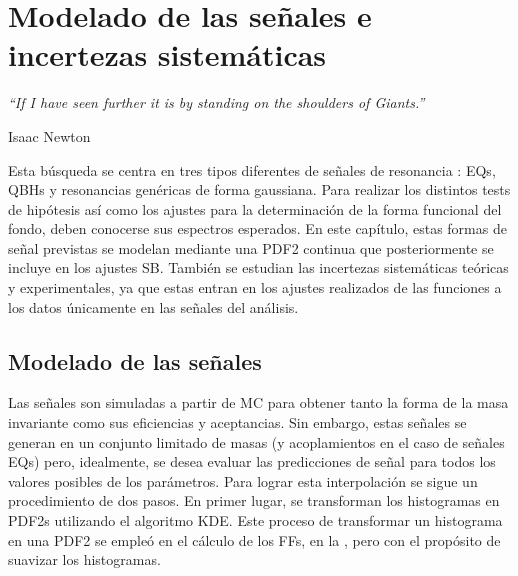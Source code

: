 \chapter{Modelado de las señales e incertezas sistemáticas}
\label{ch:signals}
\epigraph{\emph{``If I have seen further it is by standing on the shoulders of Giants.”}}{Isaac Newton}


Esta búsqueda se centra en tres tipos diferentes de señales de resonancia \gammajet: \acp{EQ}, \acp{QBH} y resonancias genéricas de forma gaussiana. Para realizar los distintos tests de hipótesis así como los ajustes para la determinación de la forma funcional del fondo, deben conocerse sus espectros \myj esperados.
En este capítulo, estas formas de señal previstas se modelan mediante una \ac{PDF2} continua que posteriormente se incluye en los ajustes \ac{SB}.
También se estudian las incertezas sistemáticas teóricas y experimentales, ya que estas entran en los ajustes realizados de las funciones a los datos únicamente en las señales del análisis.













\section{Modelado de las señales}
\label{sec:signals:modeling}

Las señales son simuladas a partir de \ac{MC} para obtener tanto la forma de la masa invariante como sus eficiencias y aceptancias. Sin embargo, estas señales se generan en un conjunto limitado de masas (y acoplamientos en el caso de señales \acp{EQ}) pero, idealmente, se desea evaluar las predicciones de señal para todos los valores posibles de los parámetros.
Para lograr esta interpolación se sigue un procedimiento de dos pasos. En primer lugar, se transforman los histogramas en \acp{PDF2} utilizando el algoritmo \ac{KDE}. Este proceso de transformar un histograma en una \ac{PDF2} se empleó en el cálculo de los \acp{FF}, en la \Sect{\ref{subsec:ss_corrections:ffs:calculation}}, pero con el propósito de suavizar los histogramas.


